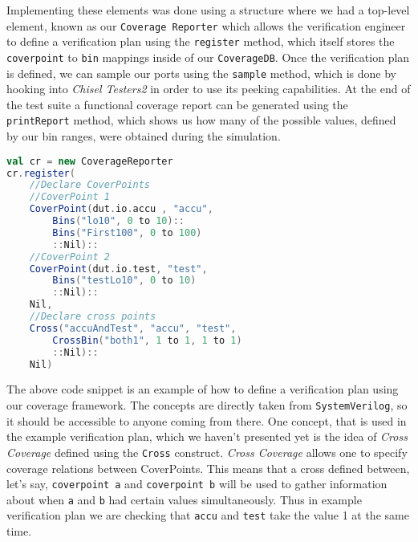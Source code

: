\documentclass[conference]{IEEEtran}
\begin{document}
Implementing these elements was done using a structure where we had a top-level element, known as our \texttt{Coverage Reporter} which allows the verification engineer to define a verification plan using the \texttt{register} method, which itself stores the \texttt{coverpoint} to \texttt{bin} mappings inside of our \texttt{CoverageDB}. Once the verification plan is defined, we can sample our ports using the \texttt{sample} method, which is done by hooking into \textit{Chisel Testers2} in order to use its peeking capabilities. At the end of the test suite a functional coverage report can be generated using the \texttt{printReport} method, which shows us how many of the possible values, defined by our bin ranges, were obtained during the simulation.
\begin{lstlisting}[language=scala]
val cr = new CoverageReporter
cr.register(
    //Declare CoverPoints
    //CoverPoint 1
    CoverPoint(dut.io.accu , "accu",
        Bins("lo10", 0 to 10)::
        Bins("First100", 0 to 100)
        ::Nil)::
    //CoverPoint 2
    CoverPoint(dut.io.test, "test", 
        Bins("testLo10", 0 to 10)
        ::Nil)::
    Nil,
    //Declare cross points
    Cross("accuAndTest", "accu", "test",
        CrossBin("both1", 1 to 1, 1 to 1)
        ::Nil)::
    Nil)
\end{lstlisting}
The above code snippet is an example of how to define a verification plan using our coverage framework. The concepts are directly taken from \texttt{SystemVerilog}, so it should be accessible to anyone coming from there. One concept, that is used in the example verification plan, which we haven't presented yet is the idea of \textit{Cross Coverage} defined using the \texttt{Cross} construct. \textit{Cross Coverage} allows one to specify coverage relations between CoverPoints. This means that a cross defined between, let's say, \texttt{coverpoint a} and \texttt{coverpoint b} will be used to gather information about when \texttt{a} and \texttt{b} had certain values simultaneously. Thus in example verification plan we are checking that \texttt{accu} and \texttt{test} take the value 1 at the same time.
\end{document}
